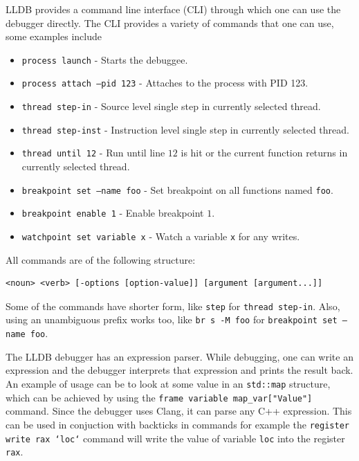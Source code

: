 LLDB provides a command line interface (CLI) through which one can use the debugger
directly. The CLI provides a variety of commands that one can use, some examples include
\begin{itemize}
    \item \texttt{process launch} - Starts the debuggee.
    \item \texttt{process attach --pid 123} - Attaches to the process with PID
        123.
    \item \texttt{thread step-in} - Source level single step in currently selected thread.
    \item \texttt{thread step-inst} - Instruction level single step in currently selected thread.
    \item \texttt{thread until 12} - Run until line $12$ is hit or the current
        function returns in currently selected thread.
    \item \texttt{breakpoint set --name foo} - Set breakpoint on all functions
        named \texttt{foo}.
    \item \texttt{breakpoint enable 1} - Enable breakpoint $1$.
    \item \texttt{watchpoint set variable x} - Watch a variable \texttt{x} for
        any writes.
\end{itemize}
All commands are of the following structure:
\begin{lstlisting}
<noun> <verb> [-options [option-value]] [argument [argument...]]
\end{lstlisting}
Some of the commands have shorter form, like \texttt{step} for \texttt{thread
step-in}. Also, using an unambiguous prefix works too, like \texttt{br s -M
foo} for \texttt{breakpoint set --name foo}.

The LLDB debugger has an expression parser. While debugging, one can write an
expression and the debugger interprets that expression and prints the result
back. An example of usage can be to look at some value in an \texttt{std::map}
structure, which can be achieved by using the \texttt{frame variable
map\_var["Value"]} command. Since the debugger uses Clang, it can parse
any C++ expression. This can be used in conjuction with backticks in commands
for example the \texttt{register write rax `loc`} command will write the
value of variable \texttt{loc} into the register \texttt{rax}.
